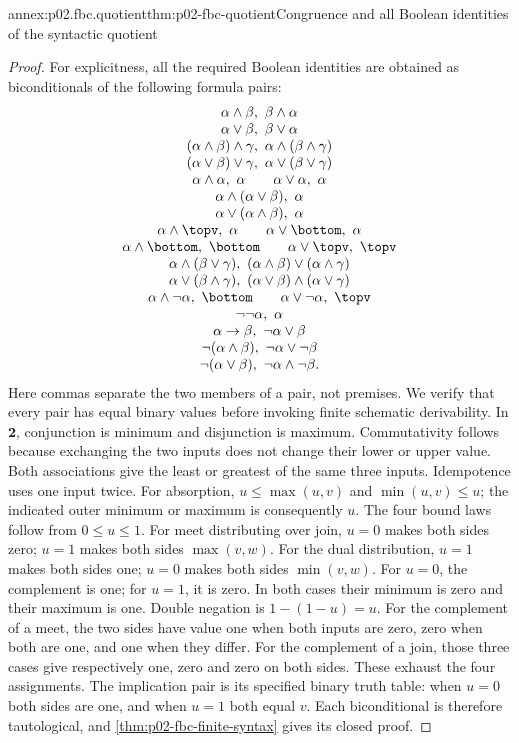 \begin{annexitem}{annex:p02.fbc.quotient}{thm:p02-fbc-quotient}{Congruence and all Boolean identities of the syntactic quotient}
\begin{proof}
For explicitness, all the required Boolean identities are obtained
as biconditionals of the following formula pairs:
\[
\begin{array}{c}
 \alpha\land\beta,\ \beta\land\alpha\\
 \alpha\lor\beta,\ \beta\lor\alpha\\
 (\alpha\land\beta)\land\gamma,\ \alpha\land(\beta\land\gamma)\\
 (\alpha\lor\beta)\lor\gamma,\ \alpha\lor(\beta\lor\gamma)\\
 \alpha\land\alpha,\ \alpha\qquad
       \alpha\lor\alpha,\ \alpha\\
 \alpha\land(\alpha\lor\beta),\ \alpha\\
 \alpha\lor(\alpha\land\beta),\ \alpha\\
 \alpha\land\topv,\ \alpha\qquad\alpha\lor\bottom,\ \alpha\\
 \alpha\land\bottom,\ \bottom\qquad\alpha\lor\topv,\ \topv\\
 \alpha\land(\beta\lor\gamma),\
       (\alpha\land\beta)\lor(\alpha\land\gamma)\\
 \alpha\lor(\beta\land\gamma),\
       (\alpha\lor\beta)\land(\alpha\lor\gamma)\\
 \alpha\land\neg\alpha,\ \bottom\qquad
       \alpha\lor\neg\alpha,\ \topv\\
 \neg\neg\alpha,\ \alpha\\
 \alpha\to\beta,\ \neg\alpha\lor\beta\\
 \neg(\alpha\land\beta),\ \neg\alpha\lor\neg\beta\\
 \neg(\alpha\lor\beta),\ \neg\alpha\land\neg\beta .
\end{array}
\]
Here commas separate the two members of a pair, not premises.
We verify that every pair has equal binary values before invoking
finite schematic derivability.
In \(\mathbf2\), conjunction is minimum and disjunction is maximum.
Commutativity follows because exchanging the two inputs does not
change their lower or upper value. Both associations give the least
or greatest of the same three inputs. Idempotence uses one input twice.
For absorption, \(u\leq\max(u,v)\) and \(\min(u,v)\leq u\);
the indicated outer minimum or maximum is consequently \(u\).
The four bound laws follow from \(0\leq u\leq1\).
For meet distributing over join, \(u=0\) makes both sides zero;
\(u=1\) makes both sides \(\max(v,w)\).
For the dual distribution, \(u=1\) makes both sides one;
\(u=0\) makes both sides \(\min(v,w)\).
For \(u=0\), the complement is one; for \(u=1\), it is zero.
In both cases their minimum is zero and their maximum is one.
Double negation is \(1-(1-u)=u\).
For the complement of a meet, the two sides have value one when
both inputs are zero, zero when both are one, and one when they differ.
For the complement of a join, those three cases give respectively
one, zero and zero on both sides. These exhaust the four assignments.
The implication pair is its specified binary truth table:
when \(u=0\) both sides are one, and when \(u=1\) both equal \(v\).
Each biconditional is therefore tautological, and
\cref{thm:p02-fbc-finite-syntax} gives its closed proof.


\end{proof}
\end{annexitem}
